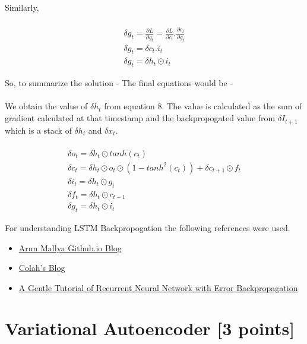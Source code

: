\\ \\ 
Similarly, 
\\ \\ 

\begin{equation}
    \begin{gathered}
    \delta g_t = \frac{\partial L}{\partial g_t} = \frac{\partial L}{\partial c_t} . \frac{\partial c_t}{\partial g_t}\\
    \delta g_t = \delta c_t . i_t\\
    \delta g_t = \delta h_t \odot i_t
    \end{gathered}
\end{equation}

So, to summarize the solution - 
The final equations would be - 
\\ \\ 
We obtain the value of $\delta h_t$ from equation 8. The value is calculated as the sum of gradient calculated at that timestamp and the backpropogated value from $\delta I_{t+1}$ which is a stack of $\delta h_t$ and $\delta x_t$. 
\\ \\ 
\begin{equation*}
    \begin{gathered}
    \delta o_t = \delta h_t \odot tanh(c_t)\\
    \delta c_t = \delta h_t \odot o_t \odot (1-tanh^2(c_t)) + \delta c_{t+1} \odot f_t\\
    \delta i_t = \delta h_t \odot g_t\\
    \delta f_t = \delta h_t \odot c_{t-1}\\
    \delta g_t = \delta h_t \odot i_t
    \end{gathered}
\end{equation*}

For understanding LSTM Backpropogation the following references were used. 
\begin{itemize}
\item \href{http://arunmallya.github.io/writeups/nn/lstm/index.html#/}{Arun Mallya Github.io Blog}
\item \href{http://colah.github.io/posts/2015-08-Understanding-LSTMs/}{Colah's Blog}
\item \href{https://arxiv.org/pdf/1610.02583.pdf}{A Gentle Tutorial of Recurrent Neural Network with Error Backpropagation}
\end{itemize}


\section{Variational Autoencoder [3 points]}
